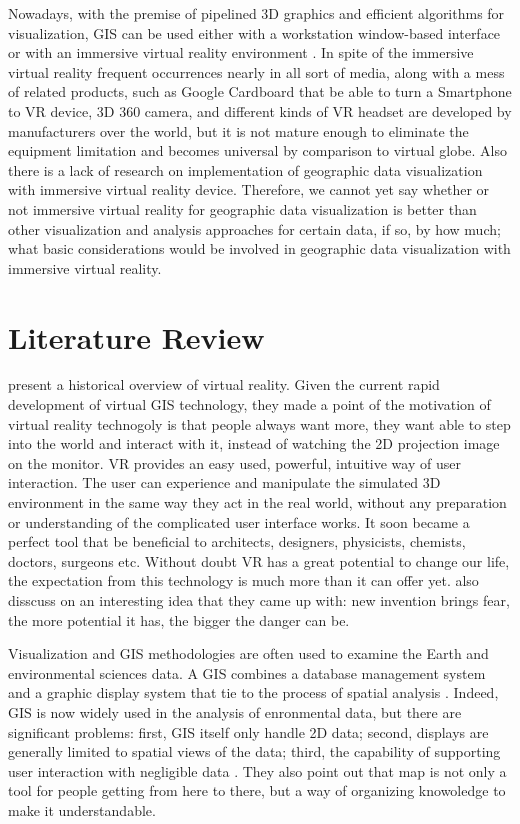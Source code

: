 Nowadays, with the premise of pipelined 3D graphics and efficient algorithms for visualization, GIS can be used either with a workstation window-based interface or with an immersive virtual reality environment \parencite{koller.virtual-gis.1995}. In spite of the immersive virtual reality frequent occurrences nearly in all sort of media, along with a mess of related products, such as Google Cardboard that be able to turn a Smartphone to VR device, 3D 360 camera, and different kinds of VR headset are developed by manufacturers over the world, but it is not mature enough to eliminate the equipment limitation and becomes universal by comparison to virtual globe. Also there is a lack of research on implementation of geographic data visualization with immersive virtual reality device. Therefore, we cannot yet say whether or not immersive virtual reality for geographic data visualization is better than other visualization and analysis approaches for certain data, if so, by how much; what basic considerations would be involved in geographic data visualization with immersive virtual reality.

\section{Literature Review}
\label{section:literature-review}

\parencite{mazuryk.vr.1996} present a historical overview of virtual reality. Given the current rapid development of virtual GIS technology, they made a point of the motivation of virtual reality technogoly is that people always want more, they want able to step into the world and interact with it, instead of watching the 2D projection image on the monitor. VR provides an easy used, powerful, intuitive way of user interaction. The user can experience and manipulate the simulated 3D environment in the same way they act in the real world, without any preparation or understanding of the complicated user interface works. It soon became a perfect tool that be beneficial to architects, designers, physicists, chemists, doctors, surgeons etc. Without doubt VR has a great potential to change our life, the expectation from this technology is much more than it can offer yet. \parencite{mazuryk.vr.1996} also disscuss on an interesting idea that they came up with: new invention brings fear, the more potential it has, the bigger the danger can be.

Visualization and GIS methodologies are often used to examine the Earth and environmental sciences data. A GIS combines a database management system and a graphic display system that tie to the process of spatial analysis \parencite{rhyne.visualization-gis.1994, rhyne.virtual.1997}. Indeed, GIS is now widely used in the analysis of enronmental data, but there are significant problems: first, GIS itself only handle 2D data; second, displays are generally limited to spatial views of the data; third, the capability of supporting user interaction with  negligible data \parencite{rhyne.visualization-gis.1994}. They also point out that map is not only a tool for people getting from here to there, but a way of organizing knowoledge to make it understandable.

